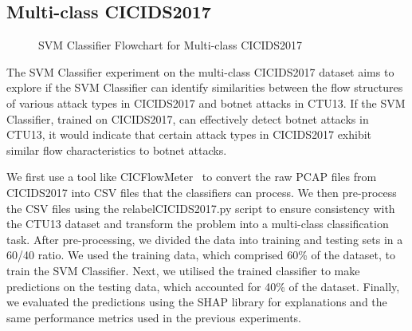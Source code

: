 \subsection{Multi-class CICIDS2017}\label{subsec:SVMClassifierMultiCICIDS2017}
\begin{figure}[H]
\centering
{}
\caption{SVM Classifier Flowchart for Multi-class CICIDS2017}\label{fig:SVMFlowMultiCICIDS2017}
\end{figure}

The SVM Classifier experiment on the multi-class CICIDS2017 dataset aims to explore if the SVM Classifier can identify similarities between the flow structures of various attack types in CICIDS2017 and botnet attacks in CTU13. If the SVM Classifier, trained on CICIDS2017, can effectively detect botnet attacks in CTU13, it would indicate that certain attack types in CICIDS2017 exhibit similar flow characteristics to botnet attacks.

We first use a tool like CICFlowMeter~\cite{lashkari2017characterization} to convert the raw PCAP files from CICIDS2017 into CSV files that the classifiers can process. We then pre-process the CSV files using the relabelCICIDS2017.py script to ensure consistency with the CTU13 dataset and transform the problem into a multi-class classification task. After pre-processing, we divided the data into training and testing sets in a 60/40 ratio. We used the training data, which comprised 60\% of the dataset, to train the SVM Classifier. Next, we utilised the trained classifier to make predictions on the testing data, which accounted for 40\% of the dataset. Finally, we evaluated the predictions using the SHAP library for explanations and the same performance metrics used in the previous experiments.